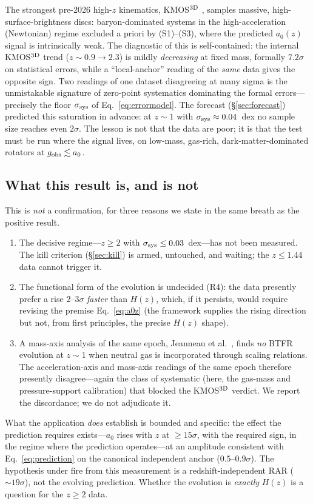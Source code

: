 \documentclass[fleqn,usenatbib]{mnras}
\newcommand{\azero}{a_0}
\newcommand{\ssys}{\sigma_{\rm sys}}
\begin{document}
The strongest pre-2026 high-$z$ kinematics, KMOS$^{3\rm D}$ \citep{Ubler2017},
samples massive, high-surface-brightness discs: baryon-dominated systems in the
high-acceleration (Newtonian) regime excluded a priori by (S1)--(S3), where the
predicted $\azero(z)$ signal is intrinsically weak. The diagnostic of this is
self-contained: the internal KMOS$^{3\rm D}$ trend ($z\sim0.9\to2.3$) is mildly
\emph{decreasing} at fixed mass, formally $7.2\sigma$ on statistical errors, while a
``local-anchor'' reading of the \emph{same} data gives the opposite sign. Two
readings of one dataset disagreeing at many sigma is the unmistakable signature of
zero-point systematics dominating the formal errors---precisely the floor $\ssys$ of
Eq.~\eqref{eq:errormodel}. The forecast (\S\ref{sec:forecast}) predicted this
saturation in advance: at $z\sim1$ with $\ssys\approx0.04$~dex no sample size reaches
even $2\sigma$. The lesson is not that the data are poor; it is that the test must be
run where the signal lives, on low-mass, gas-rich, dark-matter-dominated rotators at
$g_{\rm obs}\lesssim\azero$.

\subsection{What this result is, and is not}\label{sec:notconfirm}

This is \emph{not} a confirmation, for three reasons we state in the same breath as
the positive result.
\begin{enumerate}
\item[(i)] The decisive regime---$z\ge2$ with $\ssys\le0.03$~dex---has not been
measured. The kill criterion (\S\ref{sec:kill}) is armed, untouched, and waiting; the
$z\le1.44$ data cannot trigger it.
\item[(ii)] The functional form of the evolution is undecided (R4): the data presently
prefer a rise $2$--$3\sigma$ \emph{faster} than $H(z)$, which, if it persists, would
require revising the premise Eq.~\eqref{eq:a0z} (the framework supplies the rising
direction but not, from first principles, the precise $H(z)$ shape).
\item[(iii)] A mass-axis analysis of the same epoch, Jeanneau et al.\
\citep{Jeanneau2026}, finds \emph{no} BTFR evolution at $z\sim1$ when neutral gas is
incorporated through scaling relations. The acceleration-axis and mass-axis readings
of the same epoch therefore presently disagree---again the class of systematic
(here, the gas-mass and pressure-support calibration) that blocked the
KMOS$^{3\rm D}$ verdict. We report the discordance; we do not adjudicate it.
\end{enumerate}
What the application \emph{does} establish is bounded and specific: the effect the
prediction requires exists---$\azero$ rises with $z$ at $\ge15\sigma$, with the
required sign, in the regime where the prediction operates---at an amplitude
consistent with Eq.~\eqref{eq:prediction} on the canonical independent anchor
($0.5$--$0.9\sigma$). The hypothesis under fire from this measurement is a
redshift-independent RAR ($\sim19\sigma$), not the evolving prediction. Whether the
evolution is \emph{exactly} $H(z)$ is a question for the $z\ge2$ data.
\end{document}
